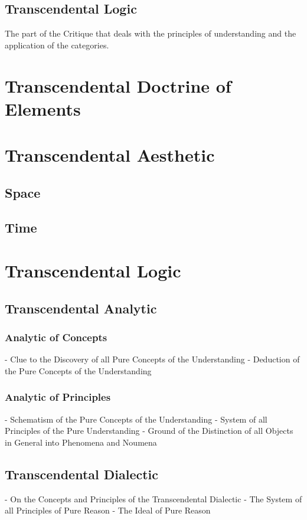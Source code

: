 \documentclass[a4paper]{article}
\begin{document}
\subsection{Transcendental Logic}
The part of the Critique that deals with the principles of understanding and the application of the categories.


\section{Transcendental Doctrine of Elements}
\section{Transcendental Aesthetic}
\subsection{Space}
\subsection{Time}

\section{Transcendental Logic}
\subsection{Transcendental Analytic}
\subsubsection{Analytic of Concepts}
- Clue to the Discovery of all Pure Concepts of the Understanding
- Deduction of the Pure Concepts of the Understanding

\subsubsection{Analytic of Principles}
- Schematism of the Pure Concepts of the Understanding
- System of all Principles of the Pure Understanding
- Ground of the Distinction of all Objects in General into Phenomena and Noumena

\subsection{Transcendental Dialectic}
- On the Concepts and Principles of the Transcendental Dialectic
- The System of all Principles of Pure Reason
- The Ideal of Pure Reason
\end{document}
